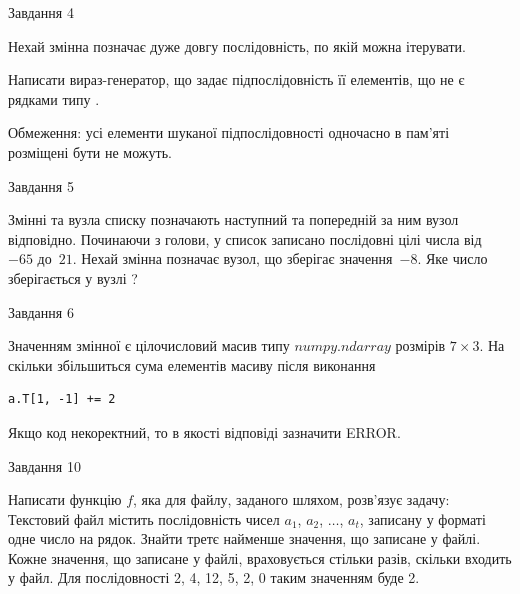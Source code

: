 \documentclass[12pt, ukrainian]{article}
\begin{document}
{               
{\begin{center}Завдання {4}\end{center}}
\vspace{-6mm}
Нехай змінна  позначає дуже довгу послідовність, по якій можна ітерувати.

Написати вираз-генератор, що задає підпослідовність її елементів, що не є рядками типу .

Обмеження: усі елементи шуканої підпослідовності одночасно в пам'яті розміщені бути не можуть.\par

\vspace{10mm}
               
{\begin{center}Завдання {5}\end{center}}
\vspace{-6mm}
Змінні  та  вузла списку позначають наступний та попередній за ним вузол відповідно. Починаючи з голови, у список записано послідовні цілі числа від~$-65$ до~$21$. Нехай змінна  позначає вузол, що зберігає значення~$-8$.
Яке число зберігається у вузлі  ?\par

               
{\begin{center}Завдання {6}\end{center}}
\vspace{-6mm}
Значенням змінної  є цілочисловий масив типу $numpy.ndarray$ розмірів $7{\times}3$. На скільки збільшиться сума елементів масиву  після виконання
\begin{verbatim}
a.T[1, -1] += 2
\end{verbatim}


Якщо код некоректний, то в якості відповіді зазначити ERROR.\par

               
{\begin{center}Завдання {10}\end{center}}
\vspace{-6mm}

Написати функцію $f$, яка для файлу, заданого шляхом, розв’язує задачу:\\ Текстовий файл містить послідовність чисел $a_1$, $a_2$, $\ldots$, $a_t$, записану у форматі одне число на рядок. Знайти третє найменше значення, що записане у файлі. Кожне значення, що записане у файлі, враховується стільки разів, скільки входить у файл. Для послідовності 2, 4, 12, 5, 2, 0 таким значенням буде 2.

}
\end{document}
